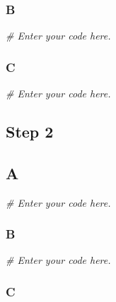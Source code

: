 \documentclass[
]{article}
\newenvironment{Shaded}{\begin{snugshade}}{\end{snugshade}}
\newcommand{\CommentTok}[1]{\textcolor[rgb]{0.56,0.35,0.01}{\textit{#1}}}
\begin{document}
\hypertarget{b}{%
\subsubsection{B}\label{b}}

\begin{Shaded}
\begin{Highlighting}[]
\CommentTok{\# Enter your code here.}
\end{Highlighting}
\end{Shaded}

\hypertarget{c}{%
\subsubsection{C}\label{c}}

\begin{Shaded}
\begin{Highlighting}[]
\CommentTok{\# Enter your code here.}
\end{Highlighting}
\end{Shaded}

\hypertarget{step-2}{%
\subsection{Step 2}\label{step-2}}

\hypertarget{a-1}{%
\subsection{A}\label{a-1}}

\begin{Shaded}
\begin{Highlighting}[]
\CommentTok{\# Enter your code here.}
\end{Highlighting}
\end{Shaded}

\hypertarget{b-1}{%
\subsubsection{B}\label{b-1}}

\begin{Shaded}
\begin{Highlighting}[]
\CommentTok{\# Enter your code here.}
\end{Highlighting}
\end{Shaded}

\hypertarget{c-1}{%
\subsubsection{C}\label{c-1}}
\end{document}
